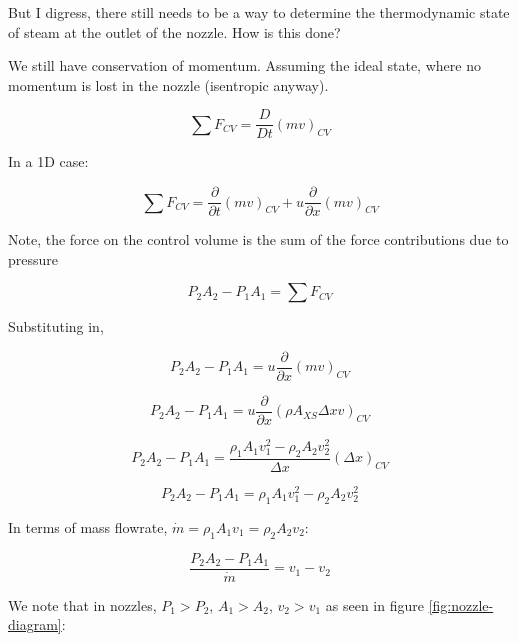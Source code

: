 \documentclass[masters]{ucbthesis}
\renewcommand{\_}{\kern-1.5pt\textunderscore\kern-1.5pt}
\begin{document}
But I digress, there still needs to be a way to determine the 
thermodynamic state of steam at the outlet of the nozzle. How is this done?

We still have conservation of momentum. Assuming the ideal state, 
where no momentum is lost in the nozzle (isentropic anyway).

\begin{equation*}
	\sum F_{CV} = \frac{D}{Dt} (m v)_{CV}
\end{equation*}

In a 1D case:

\begin{equation*}
	\sum F_{CV} = \frac{\partial }{\partial t} (m v)_{CV} 
	+ u \frac{\partial}{\partial x} (m v)_{CV}
\end{equation*}

Note, the force on the control volume is the sum of the force contributions 
due to pressure

\begin{equation*}
	P_2 A_2 - P_1 A_1 = \sum F_{CV}
\end{equation*}

Substituting in,


\begin{equation*}
	P_2 A_2 - P_1 A_1 = u \frac{\partial}{\partial x} (m v)_{CV}
\end{equation*}

\begin{equation*}
	P_2 A_2 - P_1 A_1 = u \frac{\partial}{\partial x} (\rho A_{XS} \Delta x v)_{CV}
\end{equation*}

\begin{equation*}
	P_2 A_2 - P_1 A_1 = \frac{\rho_1 A_1 v_1^2 - \rho_2 A_2 v_2^2 }{\Delta x} (\Delta x )_{CV}
\end{equation*}

\begin{equation*}
	P_2 A_2 - P_1 A_1 = \rho_1 A_1 v_1^2 - \rho_2 A_2 v_2^2 
\end{equation*}

In terms of mass flowrate, $\dot{m} = \rho_1 A_1 v_1 = \rho_2 A_2 v_2$:

\begin{equation*}
	\frac{P_2 A_2 - P_1 A_1}{\dot{m}} = v_1 - v_2
\end{equation*}

We note that in nozzles, $P_1 > P_2$, $A_1 > A_2$, $v_2 > v_1$ as 
seen in figure \ref{fig:nozzle-diagram}:
\end{document}
